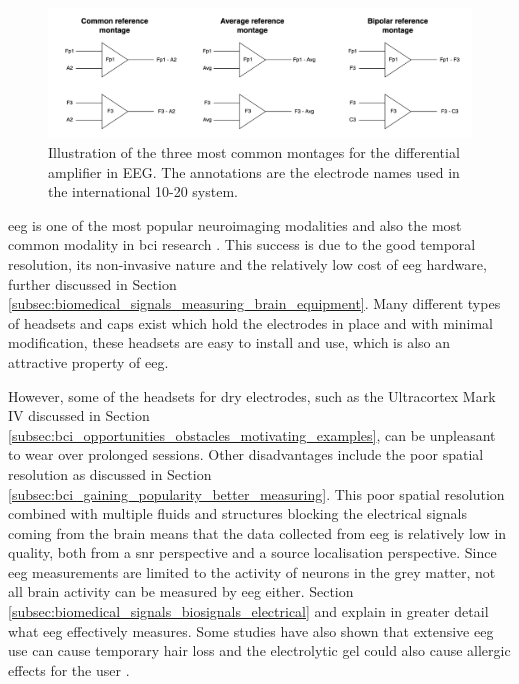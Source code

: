 \begin{figure}[ht]
    \centering
    \includegraphics[width=\linewidth]{../images/eeg/montages.pdf}
    \captionsetup{width=0.8\linewidth}
    \captionsetup{justification=centering}
    \caption{Illustration of the three most common montages for the differential amplifier in EEG. The annotations are the electrode names used in the international 10-20 system.} 
    \label{fig:biomedical_signals_eeg_montages}
\end{figure}

\Gls{eeg} is one of the most popular neuroimaging modalities and also the most common modality in \gls{bci} research \citep{modalities_review1, modalities_review2, bci_review_arnau}.
This success is due to the good temporal resolution, its non-invasive nature and the relatively low cost of \gls{eeg} hardware, further discussed in Section \ref{subsec:biomedical_signals_measuring_brain_equipment}.
Many different types of headsets and caps exist which hold the electrodes in place and with minimal modification, these headsets are easy to install and use, which is also an attractive property of \gls{eeg}.

However, some of the headsets for dry electrodes, such as the Ultracortex Mark IV discussed in Section \ref{subsec:bci_opportunities_obstacles_motivating_examples}, can be unpleasant to wear over prolonged sessions.
Other disadvantages include the poor spatial resolution as discussed in Section \ref{subsec:bci_gaining_popularity_better_measuring}.
This poor spatial resolution combined with multiple fluids and structures blocking the electrical signals coming from the brain means that the data collected from \gls{eeg} is relatively low in quality, both from a \gls{snr} perspective and a source localisation perspective.
Since \gls{eeg} measurements are limited to the activity of neurons in the grey matter, not all brain activity can be measured by \gls{eeg} either.
Section \ref{subsec:biomedical_signals_biosignals_electrical} and \citet{what_eeg_is_and_measures} explain in greater detail what \gls{eeg} effectively measures.
Some studies have also shown that extensive \gls{eeg} use can cause temporary hair loss and the electrolytic gel could also cause allergic effects for the user \citep{eeg_hair_loss, dry_electrode_status}.




